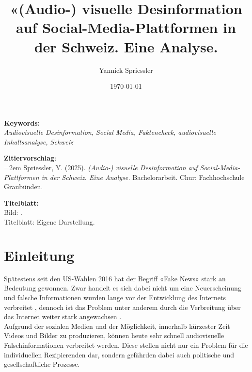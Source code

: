 \documentclass[12pt,a4paper]{article}        %
\title{«(Audio-) visuelle Desinformation auf Social-Media-Plattformen in der Schweiz. Eine Analyse.}        %
\author{Yannick Spriessler}     %
\date{\today}     %
\begin{document}
\begin{titlingpage} %
  
  \nocite{howard_trees_2017}  %
\end{titlingpage}
\pagebreak      %
\renewcommand{\abstractname}{Abstract}
\begin{abstract}
  \setlength{\parindent}{0pt}

\end{abstract}

\vfill
\textbf{Keywords:}\\ \textit{Audiovisuelle Desinformation, Social Media, Faktencheck, audiovisuelle Inhaltsanalyse, Schweiz}

\textbf{Zitiervorschlag}:\\
\hangindent=2em
Spriessler, Y. (2025). \textit{(Audio-) visuelle Desinformation auf Social-Media-Plattformen in der Schweiz. Eine Analyse.} Bachelorarbeit. Chur: Fachhochschule Graubünden.

 \textbf{Titelblatt:}\\
Bild: .\\
Titelblatt: Eigene Darstellung.
\pagebreak
\thispagestyle{empty}
\setcounter{page}{0}    %
\tableofcontents        %
\pagebreak

\section{Einleitung}
Spätestens seit den US-Wahlen 2016 hat der Begriff «Fake News» stark an Bedeutung gewonnen. Zwar handelt es sich dabei nicht um eine Neuerscheinung und falsche Informationen wurden lange vor der Entwicklung des Internets verbreitet \parencites[214]{allcott_social_2017}[247]{hohlfeld_schlechte_2020}[1]{khan_fake_2021}, dennoch ist das Problem unter anderem durch die Verbreitung über das Internet weiter stark angewachsen \parencites[214–215]{allcott_social_2017}[1]{khan_fake_2021}[1]{lazer_science_2018}[4]{ceron_fake_2021}.\\
Aufgrund der sozialen Medien und der Möglichkeit, innerhalb kürzester Zeit Videos und Bilder zu produzieren, können heute sehr schnell audiovisuelle Falschinformationen verbreitet werden. Diese stellen nicht nur ein Problem für die individuellen Rezipierenden dar, sondern gefährden dabei auch politische und gesellschaftliche Prozesse.
\end{document}
